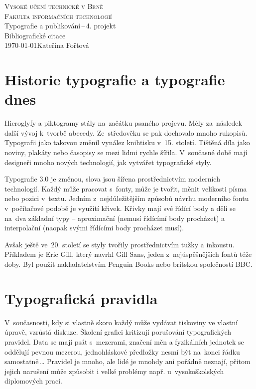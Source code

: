 \documentclass[a4paper, 11pt]{article}
\begin{document}
\begin{titlepage}
\begin{center}
\textsc{\Huge Vysoké učení technické v Brně\\ \medskip
\huge Fakulta informačních technologií}\\
\LARGE Typografie a publikování\,--\,4. projekt\\
\Huge Bibliografické citace\\
\Large \today \hfill         Kateřina Fořtová \newpage
\end{center}
\end{titlepage}

\section{Historie typografie a typografie dnes}
Hieroglyfy a piktogramy stály na~začátku psaného projevu. Měly za~následek další vývoj k~tvorbě abecedy. Ze~středověku se pak dochovalo mnoho rukopisů. Typografii jako takovou změnil vynález knihtisku v~15. století. Tištěná díla jako noviny, plakáty nebo časopisy se mezi lidmi rychle šířila. V~současné době mají designeři mnoho nových technologií, jak vytvářet typografické styly. \cite{Siebert:The_Evolution_of_Typography:_A_Brief_History}

Typografie 3.0 je změnou, slova jsou šířena prostřednictvím moderních technologií. Každý může pracovat s~fonty, může je tvořit, měnit velikosti písma nebo pozici v~textu. \cite{Print:Type_3.0:_The_Future_of_Typography_Today} Jedním z~nejdůležitějším způsobů návrhu moderního fontu v~počítačové podobě je využití křivek.  Křivky mají své řídící body a dělí se na~dva základní typy -- aproximační (nemusí řídícímí body procházet) a interpolační (naopak svými řídícími body procházet musí). \cite{Jiricek:Zivy_font}

Avšak ještě ve~20. století se styly tvořily prostřednictvím tužky a inkoustu. Příkladem je Eric Gill, který navrhl Gill Sans, jeden z~nejúspěšnějších fontů téže doby. Byl použit nakladatelstvím Penguin Books nebo britskou společností BBC. \cite{HOW:A_Brief_History_of_Typography_1928_-_1980}

\section{Typografická pravidla}
V~současnosti, kdy si vlastně skoro každý může vydávat tiskoviny ve vlastní úpravě, vzrůstá diskuze. Školení grafici kritizují porušování typografických pravidel. \cite{Storm:Co_se_da_jeste_napsat_o_typografii} Data se mají psát s~mezerami, značení měn a fyzikálních jednotek se oddělují pevnou mezerou, jednohláskové předložky nesmí být na~konci řádku samostatně\,\dots \cite{Cerna:Typografie} Pravidel je mnoho, ale lidé je mnohdy ani pořádně neznají, přitom jejich narušení může způsobit i velké problémy např. u~vysokoškolských diplomových prací.
\end{document}

